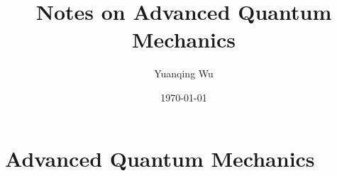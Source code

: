 \documentclass{ctexart}
\author{Yuanqing Wu}
\date{\today}
\title{Notes on Advanced Quantum Mechanics}
\begin{document}
  \maketitle
  \newpage
  \part{Advanced Quantum Mechanics}
  
  
\end{document}
